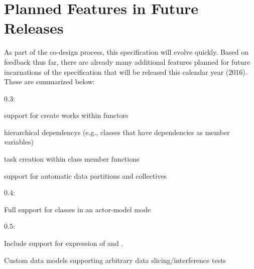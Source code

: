 \section{Planned Features in Future Releases}
\label{sec:future}

As part of the \gls{co-design} process, this specification will evolve quickly.
  Based on feedback thus far, there are already
many additional features planned for future incarnations of the specification that
will be released this calendar year (2016).  These are summarized below:

\begin{compactdesc}
\item[0.3:]
\begin{compactitem}
\item support for create works within functors 
\item hierarchical \glspl{dependency} (e.g., classes that have dependencies as
    member variables)
\item task creation within class member functions
\item support for automatic data partitions and collectives
\end{compactitem}
\item[0.4:]
\begin{compactitem}
\item Full support for classes in an actor-model mode 
\end{compactitem}
\item[0.5:]
\begin{compactitem}
\item Include support for expression of  and .
\item Custom data models supporting arbitrary data slicing/interference tests
\end{compactitem}
\end{compactdesc}
